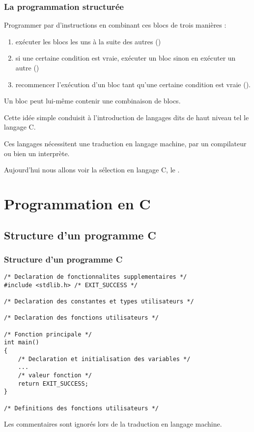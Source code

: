 \documentclass[xcolor=svgnames]{beamer}
\begin{document}
\begin{frame}
  \frametitle{La programmation structurée}
  
  \begin{definition}
    Programmer par  d'instructions en combinant ces blocs de trois manières :\pause
    \begin{enumerate}
    \item exécuter les blocs les uns à la suite des autres ()\pause
    \item si une certaine condition est vraie, exécuter un bloc sinon
      en exécuter un autre ()\pause
    \item recommencer l'exécution d'un bloc tant qu'une certaine
      condition est vraie ().\pause
    \end{enumerate}
    Un bloc peut lui-même contenir une combinaison de blocs.
  \end{definition}
\pause
Cette idée simple conduisit à l'introduction de langages dits de haut niveau tel le
langage C. 

\pause
Ces langages nécessitent une \alert{traduction en langage machine}, par un compilateur
ou bien un interprète. 

\pause
Aujourd'hui nous allons voir la sélection en langage C,  le \alert{}.
\end{frame}
\section{Programmation en C}
\subsection{Structure d'un programme C}
\begin{frame}[fragile]
  \frametitle{Structure d'un programme C\nowrite}
\begin{lstlisting}[basicstyle=\ttfamily\scriptsize] 
/* Declaration de fonctionnalites supplementaires */
#include <stdlib.h> /* EXIT_SUCCESS */

/* Declaration des constantes et types utilisateurs */

/* Declaration des fonctions utilisateurs */

/* Fonction principale */
int main()
{
    /* Declaration et initialisation des variables */
    ...
    /* valeur fonction */
    return EXIT_SUCCESS;
}

/* Definitions des fonctions utilisateurs */
\end{lstlisting}

Les commentaires sont ignorés lors de la traduction en langage machine.
\end{frame}
\end{document}
